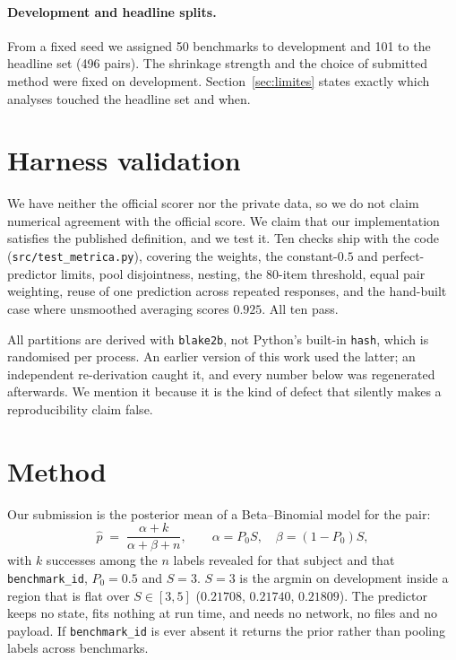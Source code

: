 \documentclass{article}
\begin{document}
\paragraph{Development and headline splits.} From a fixed seed we assigned 50
benchmarks to development and 101 to the headline set (496 pairs). The shrinkage
strength and the choice of submitted method were fixed on development.
Section~\ref{sec:limites} states exactly which analyses touched the headline set
and when.

\section{Harness validation}

We have neither the official scorer nor the private data, so we do not claim
numerical agreement with the official score. We claim that our implementation
satisfies the published definition, and we test it. Ten checks ship with the code
(\texttt{src/test\_metrica.py}), covering the weights, the constant-$0.5$ and
perfect-predictor limits, pool disjointness, nesting, the 80-item threshold,
equal pair weighting, reuse of one prediction across repeated responses, and the
hand-built case where unsmoothed averaging scores $0.925$. All ten pass.

All partitions are derived with \texttt{blake2b}, not Python's built-in
\texttt{hash}, which is randomised per process. An earlier version of this work
used the latter; an independent re-derivation caught it, and every number below
was regenerated afterwards. We mention it because it is the kind of defect that
silently makes a reproducibility claim false.

\section{Method}

Our submission is the posterior mean of a Beta--Binomial model for the pair:
\begin{equation}
\hat p \;=\; \frac{\alpha + k}{\alpha + \beta + n},
\qquad \alpha = P_0 S, \quad \beta = (1-P_0) S,
\label{eq:bb}
\end{equation}
with $k$ successes among the $n$ labels revealed for that subject and that
\texttt{benchmark\_id}, $P_0 = 0.5$ and $S = 3$. $S=3$ is the argmin on
development inside a region that is flat over $S\in[3,5]$
($0.21708$, $0.21740$, $0.21809$). The predictor keeps no state, fits nothing at
run time, and needs no network, no files and no payload. If
\texttt{benchmark\_id} is ever absent it returns the prior rather than pooling
labels across benchmarks.
\end{document}
